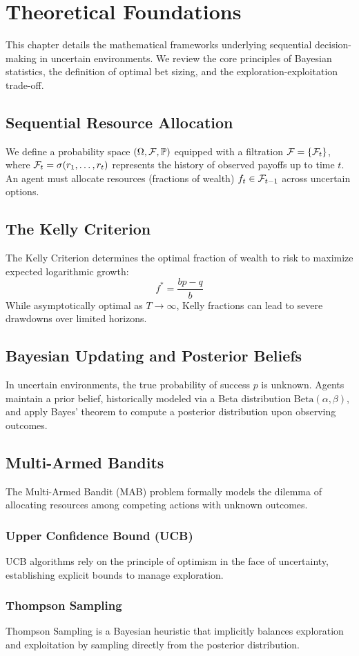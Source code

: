 \chapter{Theoretical Foundations}
\label{ch:foundations}

This chapter details the mathematical frameworks underlying sequential decision-making in uncertain environments. We review the core principles of Bayesian statistics, the definition of optimal bet sizing, and the exploration-exploitation trade-off.

\section{Sequential Resource Allocation}
We define a probability space $(\Omega, \mathcal{F}, \mathbb{P})$ equipped with a filtration $\mathcal{F} = \{\mathcal{F}_t\}$, where $\mathcal{F}_t = \sigma(r_1, \dots, r_t)$ represents the history of observed payoffs up to time $t$. An agent must allocate resources (fractions of wealth) $f_t \in \mathcal{F}_{t-1}$ across uncertain options.

\section{The Kelly Criterion}
The Kelly Criterion determines the optimal fraction of wealth to risk to maximize expected logarithmic growth:
\begin{equation}
    f^* = \frac{bp - q}{b}
\end{equation}
While asymptotically optimal as $T \to \infty$, Kelly fractions can lead to severe drawdowns over limited horizons.

\section{Bayesian Updating and Posterior Beliefs}
In uncertain environments, the true probability of success $p$ is unknown. Agents maintain a prior belief, historically modeled via a Beta distribution $\text{Beta}(\alpha, \beta)$, and apply Bayes' theorem to compute a posterior distribution upon observing outcomes.

\section{Multi-Armed Bandits}
The Multi-Armed Bandit (MAB) problem formally models the dilemma of allocating resources among competing actions with unknown outcomes.
\subsection{Upper Confidence Bound (UCB)}
UCB algorithms rely on the principle of optimism in the face of uncertainty, establishing explicit bounds to manage exploration.
\subsection{Thompson Sampling}
Thompson Sampling is a Bayesian heuristic that implicitly balances exploration and exploitation by sampling directly from the posterior distribution.
